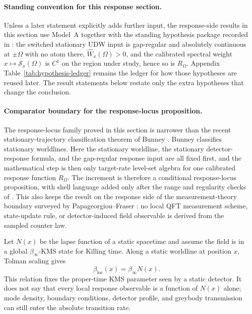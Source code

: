 \paragraph{Standing convention for this response section.}
Unless a later statement explicitly adds further input, the response-side
results in this section use Model~A together with the standing hypothesis
package recorded in : the switched stationary
UDW input is gap-regular and absolutely continuous at $\pm\Omega$ with no atom
there, $\widehat W_x(\Omega)>0$, and the calibrated spectral weight
$x\mapsto\mathcal S_x(\Omega)$ is $C^1$ on the region under study, hence so is
$R_\Omega$. Appendix Table~\ref{tab:hypothesis-ledger} remains the ledger for
how those hypotheses are reused later. The result statements below restate only
the extra hypotheses that change the
conclusion.

\paragraph{Comparator boundary for the response-locus proposition.}
The response-locus family proved in this section is narrower than the recent
stationary-trajectory classification theorem of Bunney
\cite{Bunney2024StationaryTraj}. Bunney classifies stationary worldlines. Here
the stationary worldline, the stationary detector-response formula, and the
gap-regular response input are all fixed first, and the mathematical step is
then only target-rate level-set algebra for one calibrated response function
$R_\Omega$. The increment is therefore a conditional response-locus proposition,
with shell language added only after the range and regularity checks of
. This also keeps the result on the response
side of the measurement-theory boundary surveyed by Papageorgiou--Fraser
\cite{PapageorgiouFraser2024LocalMeasurement}: no local QFT measurement
scheme, state-update rule, or detector-induced field observable is derived
from the sampled counter law.

Let $N(x)$ be the lapse function of a static spacetime and assume the field is in a global $\beta_\infty$-KMS state for Killing time. Along a static worldline at position $x$, Tolman scaling gives \cite{Tolman1930,TolmanEhrenfest1930}
\begin{equation}\label{eq:tolman-main}
\beta_{\mathrm{loc}}(x)=\beta_\infty N(x).
\end{equation}
This relation fixes the proper-time KMS parameter seen by a static detector. It does not say that every local response observable is a function of $N(x)$ alone; mode density, boundary conditions, detector profile, and greybody transmission can still enter the absolute transition rate.

